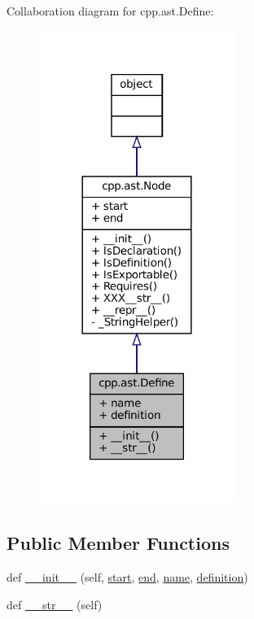 Collaboration diagram for cpp.\+ast.\+Define\+:
\nopagebreak
\begin{figure}[H]
\begin{center}
\leavevmode
\includegraphics[width=180pt]{classcpp_1_1ast_1_1Define__coll__graph}
\end{center}
\end{figure}
\subsection*{Public Member Functions}
\begin{DoxyCompactItemize}
\item 
def \hyperlink{classcpp_1_1ast_1_1Define_ae9af61866e010a863ba9f8818ec8924c}{\+\_\+\+\_\+init\+\_\+\+\_\+} (self, \hyperlink{classcpp_1_1ast_1_1Node_a7b2aa97e6a049bb1a93aea48c48f1f44}{start}, \hyperlink{classcpp_1_1ast_1_1Node_a3c5e5246ccf619df28eca02e29d69647}{end}, \hyperlink{classcpp_1_1ast_1_1Define_a8879216f09e88f79d7baa49bcfa10ebd}{name}, \hyperlink{classcpp_1_1ast_1_1Define_a0c636652dfeb2f15e62793afea1153c9}{definition})
\item 
def \hyperlink{classcpp_1_1ast_1_1Define_aa89732914b19901c8d291e11f34bb627}{\+\_\+\+\_\+str\+\_\+\+\_\+} (self)
\end{DoxyCompactItemize}
